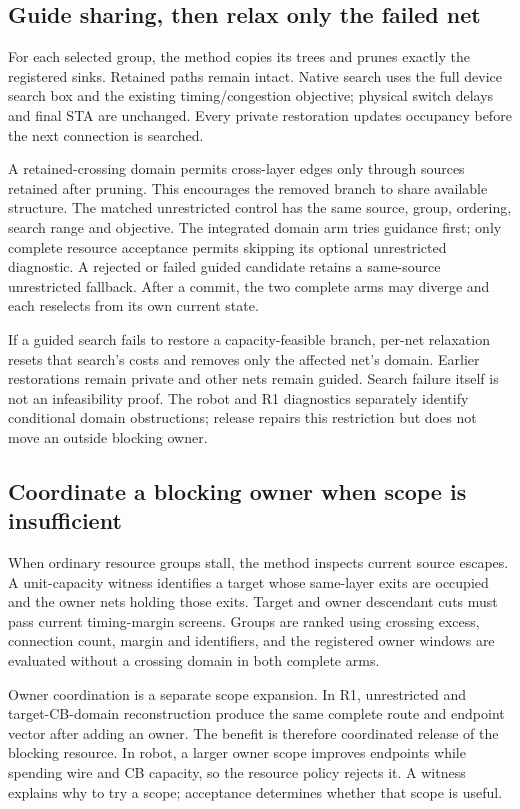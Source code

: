 \documentclass[conference,10pt]{IEEEtran}
\begin{document}
\subsection{Guide sharing, then relax only the failed net}
For each selected group, the method copies its trees and prunes exactly the registered sinks. Retained paths remain intact. Native search uses the full device search box and the existing timing/congestion objective; physical switch delays and final STA are unchanged. Every private restoration updates occupancy before the next connection is searched.

A retained-crossing domain permits cross-layer edges only through sources retained after pruning. This encourages the removed branch to share available structure. The matched unrestricted control has the same source, group, ordering, search range and objective. The integrated domain arm tries guidance first; only complete resource acceptance permits skipping its optional unrestricted diagnostic. A rejected or failed guided candidate retains a same-source unrestricted fallback. After a commit, the two complete arms may diverge and each reselects from its own current state.

If a guided search fails to restore a capacity-feasible branch, per-net relaxation resets that search's costs and removes only the affected net's domain. Earlier restorations remain private and other nets remain guided. Search failure itself is not an infeasibility proof. The robot and R1 diagnostics separately identify conditional domain obstructions; release repairs this restriction but does not move an outside blocking owner.

\subsection{Coordinate a blocking owner when scope is insufficient}
When ordinary resource groups stall, the method inspects current source escapes. A unit-capacity witness identifies a target whose same-layer exits are occupied and the owner nets holding those exits. Target and owner descendant cuts must pass current timing-margin screens. Groups are ranked using crossing excess, connection count, margin and identifiers, and the registered owner windows are evaluated without a crossing domain in both complete arms.

Owner coordination is a separate scope expansion. In R1, unrestricted and target-CB-domain reconstruction produce the same complete route and endpoint vector after adding an owner. The benefit is therefore coordinated release of the blocking resource. In robot, a larger owner scope improves endpoints while spending wire and CB capacity, so the resource policy rejects it. A witness explains why to try a scope; acceptance determines whether that scope is useful.
\end{document}
